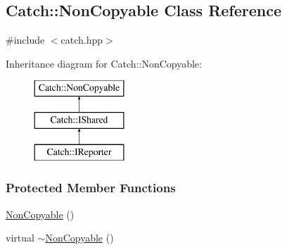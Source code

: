 \hypertarget{classCatch_1_1NonCopyable}{\subsection{Catch\-:\-:Non\-Copyable Class Reference}
\label{classCatch_1_1NonCopyable}
}


{\ttfamily \#include $<$catch.\-hpp$>$}

Inheritance diagram for Catch\-:\-:Non\-Copyable\-:\begin{figure}[H]
\begin{center}
\leavevmode
\includegraphics[height=3.000000cm]{classCatch_1_1NonCopyable}
\end{center}
\end{figure}
\subsubsection*{Protected Member Functions}
\begin{DoxyCompactItemize}
\item 
\hyperlink{classCatch_1_1NonCopyable_a4b492dd5753f9952350fb64dc6cb9fe2}{Non\-Copyable} ()
\item 
virtual \hyperlink{classCatch_1_1NonCopyable_a81254677280fef337eb4a676e91e3293}{$\sim$\-Non\-Copyable} ()
\end{DoxyCompactItemize}


